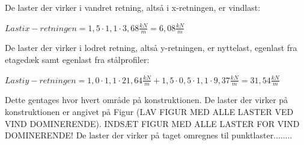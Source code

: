De laster der virker i vandret retning, altså i x-retningen, er vindlast:

\begin{center}
	$Last i x-retningen = 1,\!5 \cdot 1,\!1 \cdot 3,\!68 \frac{kN}{m} = 6,\!08 \frac{kN}{m}$
\end{center}

De laster der virker i lodret retning, altså y-retningen, er nyttelast, egenlast fra etagedæk samt egenlast fra stålprofiler:

\begin{center}
	$Last i y-retningen = 1,\!0 \cdot 1,\!1 \cdot 21,\!64 \frac{kN}{m} + 1,\!5 \cdot 0,\!5 \cdot 1,\!1 \cdot 9,\!37 \frac{kN}{m} = 31,\!54 \frac{kN}{m}$ 
\end{center}

Dette gentages hvor hvert område på konstruktionen. De laster der virker på konstruktionen er angivet på Figur (LAV FIGUR MED ALLE LASTER VED VIND DOMINERENDE). 
\newline
\newline
INDSÆT FIGUR MED ALLE LASTER FOR VIND DOMINERENDE!
\newline
\newline
De laster der virker på taget omregnes til punktlaster........